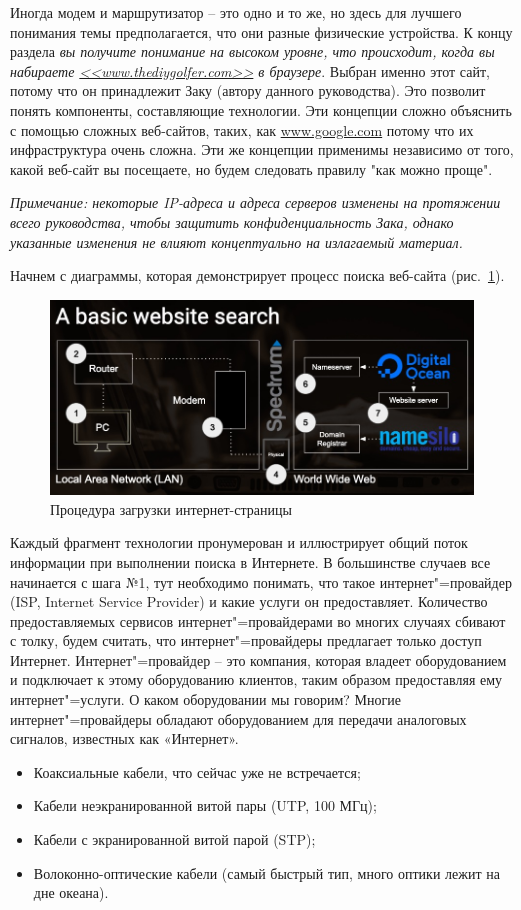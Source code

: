 \documentclass[a4paper,12pt,final,openany]{extbook}
\providecommand{\tightlist}{%
  \setlength{\itemsep}{0pt}\setlength{\parskip}{0pt}}
\begin{document}
Иногда модем и маршрутизатор -- это одно и то же, но здесь для лучшего понимания темы предполагается, что они разные физические устройства. К концу раздела \emph{вы получите понимание
на высоком уровне, что происходит, когда вы набираете
\href{http://www.thediygolfer.com}{<<www.thediygolfer.com>>} в браузере}.
Выбран именно этот сайт, потому что он принадлежит Заку (автору
данного руководства). Это позволит понять компоненты, составляющие
технологии. Эти концепции сложно объяснить с помощью сложных веб-сайтов,
таких, как \href{http://www.google.com}{www.google.com} потому что их
инфраструктура очень сложна. Эти же концепции применимы независимо от
того, какой веб-сайт вы посещаете, но будем следовать правилу "как можно
проще".

\emph{Примечание: некоторые IP-адреса и адреса серверов изменены на протяжении всего руководства, чтобы защитить конфиденциальность Зака,
однако указанные изменения не влияют концептуально на излагаемый
материал.}

Начнем с диаграммы, которая демонстрирует процесс поиска веб-сайта (рис.~\ref{fig:pageloading}).
\begin{figure}[tbh]
  \centering
  \includegraphics[width=0.9\linewidth]{blog/2019/bash-essentials/basic-web-search.jpg}

  \caption{Процедура загрузки интернет-страницы}
  \label{fig:pageloading}
\end{figure}

Каждый фрагмент технологии пронумерован и иллюстрирует общий поток информации при выполнении поиска в Интернете. В большинстве случаев все начинается с шага №1, тут необходимо понимать, что такое интернет"=провайдер (ISP, Internet Service Provider) и какие услуги он предоставляет. Количество предоставляемых сервисов интернет"=провайдерами во многих случаях сбивают с толку, будем считать, что интернет"=провайдеры предлагает только доступ Интернет. Интернет"=провайдер -- это компания, которая владеет оборудованием и подключает к этому оборудованию клиентов, таким образом предоставляя ему интернет"=услуги. О каком оборудовании мы говорим? Многие интернет"=провайдеры обладают оборудованием для передачи аналоговых сигналов, известных как «Интернет».
\begin{itemize}
\tightlist
\item
  Коаксиальные кабели, что сейчас уже не встречается;
\item
  Кабели неэкранированной витой пары (UTP, 100 МГц);
\item
  Кабели с экранированной витой парой (STP);
\item
  Волоконно-оптические кабели (самый быстрый тип, много оптики лежит на   дне океана).
\end{itemize}
\end{document}
